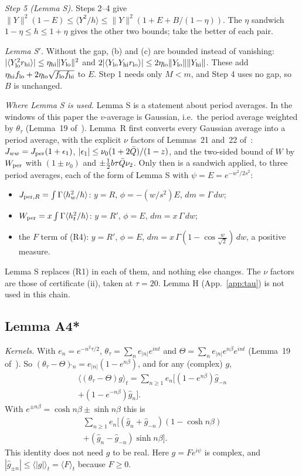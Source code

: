 \emph{Step 5 (Lemma S).} Steps 2--4 give $\|Y\|^2(1-E)\le\langle Y^2/h\rangle\le\|Y\|^2(1+E+B/(1-\eta))$.
The $\eta$ sandwich $1-\eta\le h\le1+\eta$ gives the other two bounds; take the better of each pair.

\emph{Lemma S$'$.} Without the gap, (b) and (c) are bounded instead of vanishing:
$|\langle Y_{\rm lo}^2r_{\rm hi}\rangle|\le\eta_{\rm hi}\|Y_{\rm lo}\|^2$ and $2|\langle Y_{\rm lo}Y_{\rm hi}r_{\rm lo}\rangle|\le2\eta_{\rm lo}\|Y_{\rm lo}\|\|Y_{\rm hi}\|$.
These add $\eta_{\rm hi}f_{\rm lo}+2\eta_{\rm lo}\sqrt{f_{\rm lo}f_{\rm hi}}$ to $E$.
Step 1 needs only $M<m$, and Step 4 uses no gap, so $B$ is unchanged.

\emph{Where Lemma S is used.}
Lemma S is a statement about period averages.
In the windows of this paper the $v$-average is Gaussian, i.e.\ the period average weighted by $\theta_\tau$ (Lemma~19 of~\cite{F}).
Lemma~R first converts every Gaussian average into a period average, with the explicit $\nu$ factors of Lemmas~21 and~22 of~\cite{F}:
$J_{ww}=J_{\rm per}(1+\epsilon_1)$, $|\epsilon_1|\le\nu_0(1+2\bar Q)/(1-z)$, and the two-sided bound of $W$ by $W_{\rm per}$ with $(1\pm\nu_0)$ and $\pm\frac12b\tau\bar Q\nu_2$.
Only then is a sandwich applied, to three period averages, each of the form of Lemma S with $\psi=E=e^{-w^2/2s^2}$:
\begin{itemize}
\item $J_{{\rm per},R}=\int\Gamma\langle h_w^2/h\rangle$: $y=R$, $\phi=-(w/s^2)E$, $dm=\Gamma\,dw$;
\item $W_{\rm per}=x\int\Gamma\langle h_t^2/h\rangle$: $y=R'$, $\phi=E$, $dm=x\,\Gamma\,dw$;
\item the $F$ term of (R4): $y=R'$, $\phi=E$, $dm=x\,\Gamma(1-\cos\frac w{\sqrt2})\,dw$, a positive measure.
\end{itemize}
Lemma S replaces (R1) in each of them, and nothing else changes.
The $\nu$ factors are those of certificate (ii), taken at $\tau=20$.
Lemma H (App.~\ref{app:tau}) is not used in this chain.

\subsection{Lemma A4*}
\label{app:details:A4}
\emph{Kernels.} With $e_n=e^{-n^2\tau/2}$, $\theta_\tau=\sum_ne_{|n|}e^{int}$ and $\Theta=\sum_ne_{|n|}e^{n\beta}e^{int}$ (Lemma~19 of~\cite{F}).
So $(\theta_\tau-\Theta)\hat{}_n=e_{|n|}(1-e^{n\beta})$, and for any (complex) $g$,
\begin{multline}
\langle(\theta_\tau-\Theta)g\rangle_t=\sum_{n\ge1}e_n\bigl[(1-e^{n\beta})\hat g_{-n}\\
+(1-e^{-n\beta})\hat g_n\bigr].
\end{multline}
With $e^{\pm n\beta}=\cosh n\beta\pm\sinh n\beta$ this is
\begin{multline}
\sum_{n\ge1}e_n\bigl[(\hat g_n+\hat g_{-n})(1-\cosh n\beta)\\
+(\hat g_n-\hat g_{-n})\sinh n\beta\bigr].
\end{multline}
This identity does not need $g$ to be real.
Here $g=Fe^{i\psi}$ is complex, and $|\hat g_{\pm n}|\le\langle|g|\rangle_t=\langle F\rangle_t$ because $F\ge0$.

